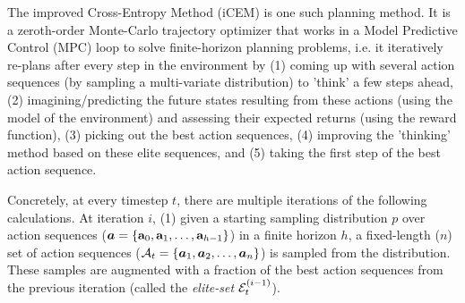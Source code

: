 The improved Cross-Entropy Method (iCEM) is one such planning method.
It is a zeroth-order Monte-Carlo trajectory optimizer that works in a Model Predictive Control (MPC) loop to solve finite-horizon planning problems, i.e. it iteratively re-plans after every step in the environment by (1) coming up with several action sequences (by sampling a multi-variate distribution) to 'think' a few steps ahead, (2) imagining/predicting the future states resulting from these actions (using the model of the environment) and assessing their expected returns (using the reward function), (3) picking out the best action sequences, (4) improving the 'thinking' method based on these elite sequences, and (5) taking the first step of the best action sequence.

Concretely, at every timestep \(t\), there are multiple iterations of the following calculations. At iteration \(i\),
(1) given a starting sampling distribution \(p\) over action sequences (\(\bm{a} = \{ \mathbf{a}_0, \mathbf{a}_1, \ldots, \mathbf{a}_{h-1} \}\)) in a finite horizon \(h\), a fixed-length (\(n\)) set of action sequences (\(\mathcal{A}_t = \{ \bm{a}_1, \bm{a}_2, \ldots, \bm{a}_n \}\)) is sampled from the distribution.
These samples are augmented with a fraction of the best action sequences from the previous iteration (called the \textit{elite-set} \(\mathcal{E}_t^{(i-1)}\)).

